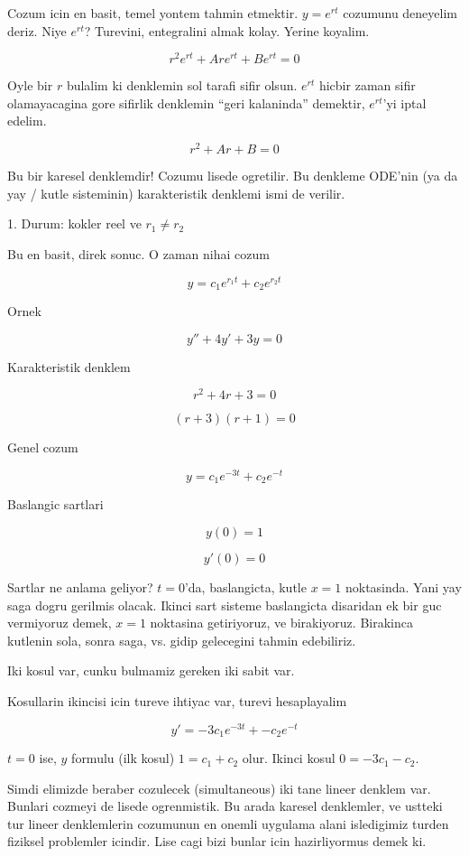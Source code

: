 \documentclass[12pt,fleqn]{article}
\begin{document}
Cozum icin en basit, temel yontem tahmin etmektir. $y = e^{rt}$ cozumunu
deneyelim deriz. Niye $e^{rt}$? Turevini, entegralini almak kolay. Yerine
koyalim. 

\[ r^2e^{rt} + Are^{rt} + Be^{rt} = 0 \]

Oyle bir $r$ bulalim ki denklemin sol tarafi sifir olsun. $e^{rt}$ hicbir
zaman sifir olamayacagina gore sifirlik denklemin ``geri kalaninda''
demektir, $e^{rt}$'yi iptal edelim. 

\[ r^2 + Ar + B = 0 \]

Bu bir karesel denklemdir! Cozumu lisede ogretilir. Bu denkleme ODE'nin
(ya da yay / kutle sisteminin) karakteristik denklemi ismi de verilir.

1. Durum: kokler reel ve $r_1 \ne r_2$

Bu en basit, direk sonuc. O zaman nihai cozum

\[ y = c_1 e^{r_1t} + c_2  e^{r_2t}\]

Ornek

\[ y'' + 4y' + 3y = 0 \]

Karakteristik denklem

\[ r^2 + 4r + 3 = 0 \]

\[ (r+3)(r+1) = 0 \]

Genel cozum

\[ y = c_1e^{-3t} + c_2e^{-t} \]

Baslangic sartlari 

\[ y(0) = 1 \]

\[ y'(0) = 0 \]

Sartlar ne anlama geliyor? $t=0$'da, baslangicta, kutle $x=1$
noktasinda. Yani yay saga dogru gerilmis olacak. Ikinci sart sisteme
baslangicta disaridan ek bir guc vermiyoruz demek, $x=1$ noktasina
getiriyoruz, ve birakiyoruz. Birakinca kutlenin sola, sonra saga, vs. gidip
gelecegini tahmin edebiliriz. 

Iki kosul var, cunku bulmamiz gereken iki sabit var. 

Kosullarin ikincisi icin tureve ihtiyac var, turevi hesaplayalim

\[ y' = -3c_1e^{-3t} + - c_2 e^{-t} \]

$t = 0$ ise, $y$ formulu (ilk kosul) $1 = c_1 + c_2$ olur. Ikinci kosul
$0 =
-3c_1 - c_2$. 

Simdi elimizde beraber cozulecek (simultaneous) iki tane lineer denklem
var. Bunlari cozmeyi de lisede ogrenmistik. Bu arada karesel denklemler, ve
ustteki tur lineer denklemlerin cozumunun en onemli uygulama alani
isledigimiz turden fiziksel problemler icindir. Lise cagi bizi bunlar icin
hazirliyormus demek ki.
\end{document}
